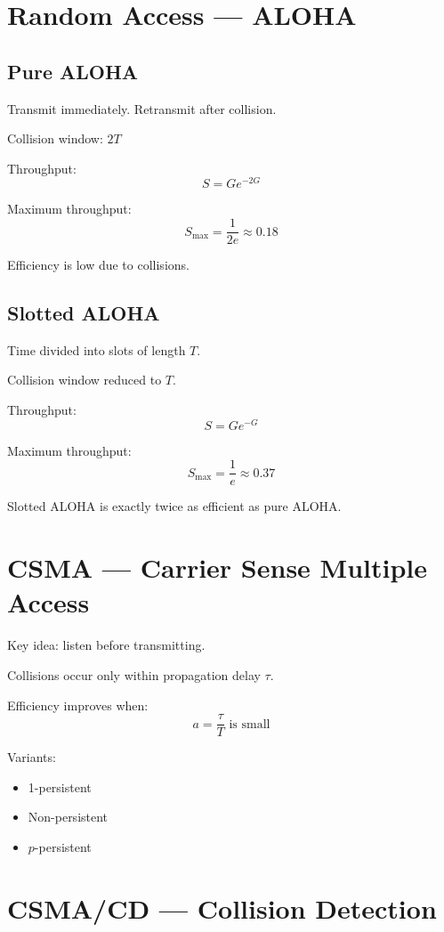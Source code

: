 \documentclass[11pt]{article}
\begin{document}
\section{Random Access — ALOHA}

\subsection{Pure ALOHA}

Transmit immediately. Retransmit after collision.

Collision window: $2T$

Throughput:
\[
S = G e^{-2G}
\]

Maximum throughput:
\[
S_{\max} = \frac{1}{2e} \approx 0.18
\]

Efficiency is low due to collisions.

\subsection{Slotted ALOHA}

Time divided into slots of length $T$.

Collision window reduced to $T$.

Throughput:
\[
S = G e^{-G}
\]

Maximum throughput:
\[
S_{\max} = \frac{1}{e} \approx 0.37
\]

Slotted ALOHA is exactly twice as efficient as pure ALOHA.

\section{CSMA — Carrier Sense Multiple Access}

Key idea: listen before transmitting.

Collisions occur only within propagation delay $\tau$.

Efficiency improves when:
\[
a = \frac{\tau}{T} \text{ is small}
\]

Variants:
\begin{itemize}
\item 1-persistent
\item Non-persistent
\item $p$-persistent
\end{itemize}

\section{CSMA/CD — Collision Detection}
\end{document}
